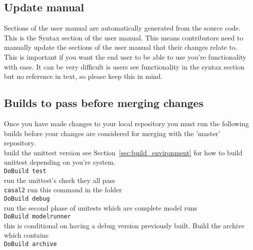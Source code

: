 \subsection{Update manual}
Sections of the user manual are automatically generated from the source code. This is the Syntax section of the user manual. This means contributors need to manually update the sections of the user manual that their changes relate to. This is important if you want the end user to be able to use you're functionality with ease. It can be very difficult is users see functionality in the syntax section but no reference in text, so please keep this in mind.


\subsection{Builds to pass before merging changes}
Once you have made changes to your local repository you must run the following builds before your changes are considered for merging with the 'master' repository.
\\
build the unittest version see Section~\ref{sec:build_environment} for how to build unittest depending on you're system.
\\
\texttt{DoBuild test}
\\
run the unittest's check they all pass
\\
\texttt{casal2} run this command in the  folder
\\
\texttt{DoBuild debug}
\\
run the second phase of unitests which are complete model runs
\\
\texttt{DoBuild modelrunner}
\\
this is conditional on having a debug version previously built.
Build the archive which contains
\\
\texttt{DoBuild archive}


